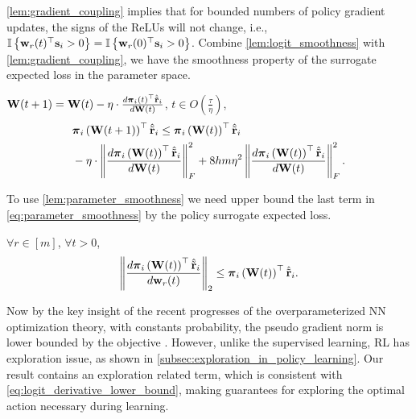 \cref{lem:gradient_coupling} implies that for bounded numbers of policy gradient updates, the signs of the ReLUs will not change, i.e., ${\mathbb{I}}\left\{ {\mathbf{w}}_r(t)^\top {\mathbf{s}}_i > 0 \right\} = {\mathbb{I}}\left\{ {\mathbf{w}}_r(0)^\top {\mathbf{s}}_i > 0 \right\}$. Combine \cref{lem:logit_smoothness} with \cref{lem:gradient_coupling}, we have the smoothness property of the surrogate expected loss in the parameter space.
\begin{lem}
\label{lem:parameter_smoothness}
    ${\mathbf{W}}(t+1) = {\mathbf{W}}(t) - \eta \cdot \frac{d {\boldsymbol{\pi}}_i(t)^\top \hat{{\tilde{\mathbf{r}}}}_i}{d {\mathbf{W}}(t)}$, $t \in O\left( \frac{\tau}{\eta}\right)$,
\begin{equation}
\label{eq:parameter_smoothness}
\begin{split}
\small
    &\rvpi_i\left( \rmW(t+1) \right)^\top \hat{\rvtilder}_i \le \rvpi_i\left( \rmW(t) \right)^\top \hat{\rvtilder}_i \\
    &- \eta \cdot \left\| \frac{d \rvpi_i\left( \rmW(t) \right)^\top \hat{\rvtilder}_i}{d \rmW(t)} \right\|_F^2 + 8 h m \eta^2 \left\| \frac{d \rvpi_i\left( \rmW(t) \right)^\top \hat{\rvtilder}_i}{d \rmW(t)} \right\|_F^2.
\end{split}
\end{equation}
\end{lem}

To use \cref{lem:parameter_smoothness} we need upper bound the last term in \cref{eq:parameter_smoothness} by the policy surrogate expected loss.
\begin{lem}
\label{lem:gradient_upper_bound}
$\forall r \in [m]$, $\forall t > 0$,
\begin{equation*}
\begin{split}
	\left\| \frac{d {\boldsymbol{\pi}}_i\left( {\mathbf{W}}(t) \right)^\top \hat{{\tilde{\mathbf{r}}}}_i}{d {\mathbf{w}}_r(t)} \right\|_2 \le {\boldsymbol{\pi}}_i\left( {\mathbf{W}}(t) \right)^\top \hat{{\tilde{\mathbf{r}}}}_i.
\end{split}
\end{equation*}
\end{lem}

Now by the key insight of the recent progresses of the overparameterized NN optimization theory, with constants probability, the pseudo gradient norm is lower bounded by the objective \citep{li2018learning}. However, unlike the supervised learning, RL has exploration issue, as shown in \cref{subsec:exploration_in_policy_learning}. Our result contains an exploration related term, which is consistent with \cref{eq:logit_derivative_lower_bound}, making guarantees for exploring the optimal action necessary during learning.

